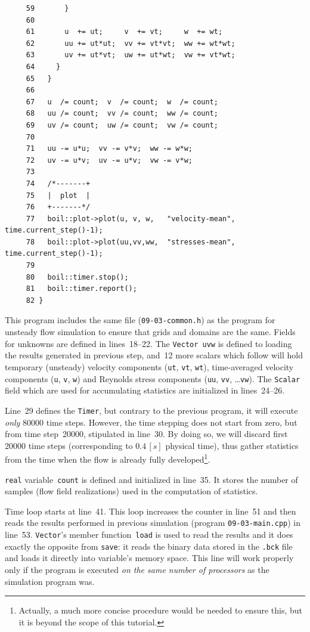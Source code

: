 {\begin{verbatim}
     59       }
     60
     61       u  += ut;     v  += vt;     w  += wt;
     62       uu += ut*ut;  vv += vt*vt;  ww += wt*wt;
     63       uv += ut*vt;  uw += ut*wt;  vw += vt*wt;
     64     }
     65   }
     66
     67   u  /= count;  v  /= count;  w  /= count;
     68   uu /= count;  vv /= count;  ww /= count;
     69   uv /= count;  uw /= count;  vw /= count;
     70
     71   uu -= u*u;  vv -= v*v;  ww -= w*w;
     72   uv -= u*v;  uv -= u*v;  vw -= v*w;
     73
     74   /*-------+
     75   |  plot  |
     76   +-------*/
     77   boil::plot->plot(u, v, w,   "velocity-mean", time.current_step()-1);
     78   boil::plot->plot(uu,vv,ww,  "stresses-mean", time.current_step()-1);
     79
     80   boil::timer.stop();
     81   boil::timer.report();
     82 }
\end{verbatim}}
%
This program includes the same file ({\tt 09-03-common.h}) as the program for 
unsteady flow simulation to ensure that grids and domains are the same. Fields
for unknowns are defined in lines~18--22. The {\tt Vector uvw} is defined
to loading the results generated in previous step, and~12 more scalars which 
follow will hold temporary (unsteady) velocity components ({\tt ut}, {\tt vt}, {\tt wt}),
time-averaged velocity components ({\tt u}, {\tt v}, {\tt w}) and Reynolds
stress components ({\tt uu}, {\tt vv}, \dots {\tt vw}). The {\tt Scalar}
field which are used for accumulating statistics are initialized in lines~24--26.

Line~29 defines the {\tt Timer}, but contrary to the previous program, it
will execute {\em only} 80000 time steps. However, the time stepping does
not start from zero, but from time step~20000, stipulated in line~30. By
doing so, we will discard first 20000 time steps (corresponding to $0.4 \, [s]$
physical time), thus gather statistics from the time when the flow is already 
fully developed\footnote{Actually, a much more concise procedure would be
needed to ensure this, but it is beyond the scope of this tutorial.}. 

{\tt real} variable~{\tt count} is defined and initialized in line~35. It stores
the number of samples (flow field realizations) used in the computation of
statistics. 

Time loop starts at line~41. This loop increases the counter in line~51 
and then reads the results performed in previous
simulation (program {\tt 09-03-main.cpp}) in line~53. {\tt Vector}'s member
function~{\tt load} is used to read the results and it does exactly the opposite
from {\tt save}: it reads the binary data stored in the {\tt .bck} file and
loads it directly into variable's memory space. This line will work properly 
only if the program is executed {\em on the same number of processors} as the 
simulation program was. 

